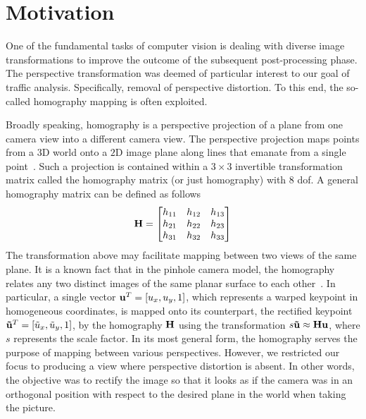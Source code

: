 \section{Motivation}
\label{sec:HomographyMotivation}

One of the fundamental tasks of computer vision is dealing with diverse image transformations to improve the outcome of the subsequent post-processing phase. The perspective transformation was deemed of particular interest to our goal of traffic analysis. Specifically, removal of perspective distortion. To this end, the so-called homography mapping is often exploited.

Broadly speaking, homography is a perspective projection of a plane from one camera view into a different camera view. The perspective projection maps points from a $3$D world onto a $2$D image plane along lines that emanate from a single point~\cite{geetha2013automatic, bousaid2020perspective}. Such a projection is contained within a $3 \times 3$ invertible transformation matrix called the homography matrix (or just homography) with $8$ \gls{dof}. A general homography matrix can be defined as follows
\begin{equation}
  \label{eq:HomographyMatrix}
  \mathbf{H} =
  \begin{bmatrix}
    h_{11} & h_{12} & h_{13} \\
    h_{21} & h_{22} & h_{23} \\
    h_{31} & h_{32} & h_{33}
  \end{bmatrix}
\end{equation}
The transformation above may facilitate mapping between two views of the same plane. It is a known fact that in the pinhole camera model, the homography relates any two distinct images of the same planar surface to each other~\cite{hartley2003multiple, hartley1997defense}. In particular, a single vector ${\mathbf{u}}^T = \left[ {u_x, u_y, 1} \right]$, which represents a warped keypoint in homogeneous coordinates, is mapped onto its counterpart, the rectified keypoint ${\mathbf{\tilde{u}}}^T = \left[ {\tilde{u}_x, \tilde{u}_y, 1} \right]$, by the homography $\mathbf{H}$ using the transformation $s \mathbf{\tilde{u}} \approx \mathbf{H} \mathbf{u}$, where $s$ represents the scale factor. In its most general form, the homography serves the purpose of mapping between various perspectives. However, we restricted our focus to producing a view where perspective distortion is absent. In other words, the objective was to rectify the image so that it looks as if the camera was in an orthogonal position with respect to the desired plane in the world when taking the picture.


